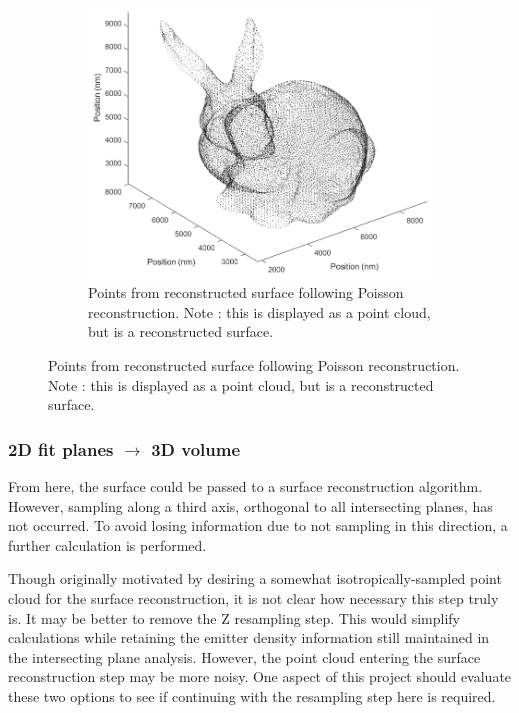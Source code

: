 \documentclass[10pt,a4paper]{article}
\begin{document}
\begin{figure}
\begin{subfigure}[b]{.45\textwidth}
		\label{fig:bunnyMeridians}
	\end{subfigure}
	\vfill
	\begin{subfigure}[b]{.65\textwidth}
		\centering
		\includegraphics[width=\textwidth]{./figures/reconBunnyCloud.png}
		\caption[Step3]{Points from reconstructed surface following Poisson reconstruction. Note : this is displayed as a point cloud, but is a reconstructed surface.}
		\label{fig:bunnyRecon}
	\end{subfigure}
\end{figure}

\subsubsection{2D fit planes $\rightarrow$ 3D volume}

From here, the surface could be passed to a surface reconstruction algorithm.  However, sampling along a third axis, orthogonal to all intersecting planes, has not occurred.  To avoid losing information due to not sampling in this direction, a further calculation is performed. 

Though originally motivated by desiring a somewhat isotropically-sampled point cloud for the surface reconstruction, it is not clear how necessary this step truly is.  It may be better to remove the Z resampling step.  This would simplify calculations while retaining the emitter density information still maintained in the intersecting plane analysis.  However, the point cloud entering the surface reconstruction step may be more noisy.  One aspect of this project should evaluate these two options to see if continuing with the resampling step here is required.  
\end{document}
